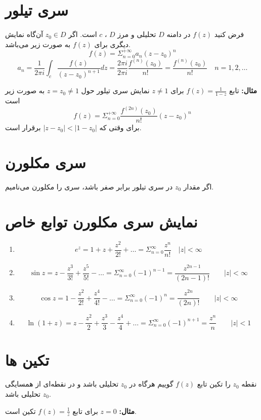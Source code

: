 \documentclass[12pt]{report}
\begin{document}
\section{سری تیلور}
فرض کنید
$f(z)$
در دامنه 
$D$
تحلیلی و مرز
$D$
،
$c$
است.
اگر
$z_0 \in D$
آن‌گاه نمایش دیگری برای
$f(z)$
به صورت زیر می‌باشد.
$$f(z) = \Sigma_{n = 0}^{+\infty} a_n(z - z_0)^n$$
$$a_n = \frac{1}{2\pi i} \int_{c} \frac{f(z)}{(z - z_0)^{n + 1}}dz = \frac{2\pi i }{2\pi i} \frac{f^(n)(z_0)}{n!} = \frac{f^(n)(z_0)}{n!} \quad n = 1, 2, \dots$$
\newline

\textbf{مثال:}
تابع
$f(z) = \frac{1}{1 - z}$
برای
$z \neq 1$
نمایش سری تیلور حول
$z = z_0 \neq 1$
به صورت زیر است
$$f(z) = \Sigma_{n = 0}^{+\infty} \frac{f^{(2n)}(z_0)}{n!}(z - z_0)^n$$
برای وقتی که 
$|z - z_0| < |1 - z_0|$
برقرار است.
\section{سری مکلورن}
اگر مقدار
$z_0$
در سری تیلور برابر صفر باشد، سری را مکلورن می‌نامیم.
\section{نمایش سری مکلورن توابع خاص}
\begin{enumerate}
	
	\item
	$$e^z = 1 +z + \frac{z^2}{2!} + \dots = \Sigma_{n = 0}^{\infty} \frac{z^n}{n!} \quad |z|< \infty$$
	\item
	$$\sin z = z - \frac{z^3}{3!} +  \frac{z^5}{5!} - \dots = \Sigma_{n = 0}^{\infty} (-1)^{n -1 } = \frac{z^{2n - 1}}{(2n - 1)!}\qquad |z| < \infty$$
	\item
	$$\cos z = 1 - \frac{z^2}{2!} +  \frac{z^4}{4!} - \dots = \Sigma_{n = 0}^{\infty} (-1)^{n } = \frac{z^{2n }}{(2n)!}\qquad |z| < \infty$$
	\item
	$$\ln (1 + z) = z - \frac{z^2}{2} + \frac{z^3}{3} - \frac{z^4}{4} + \dots = \Sigma_{n = 0}^{\infty} (-1)^{n +1} = \frac{z^{n }}{n}\qquad |z| < 1$$
	
	
\end{enumerate}
\section{تکین ها}
نقطه
$z_0$
را تکین تابع
$f(z)$
گوییم هرگاه در 
$z_0$
تحلیلی باشد و در نقطه‌ای از همسایگی
$z_0$
تحلیلی باشد.
\newline

\textbf{مثال:}
$z = 0$
برای تابع
$f(z) = \frac{1}{z}$
تکین است.
\end{document}
